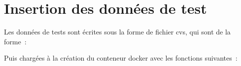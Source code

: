 ﻿\section{Insertion des données de test}
Les données de tests sont écrites sous la forme de fichier cvs, qui sont de la forme~:



Puis chargées à la création du conteneur docker avec les fonctions suivantes~:


